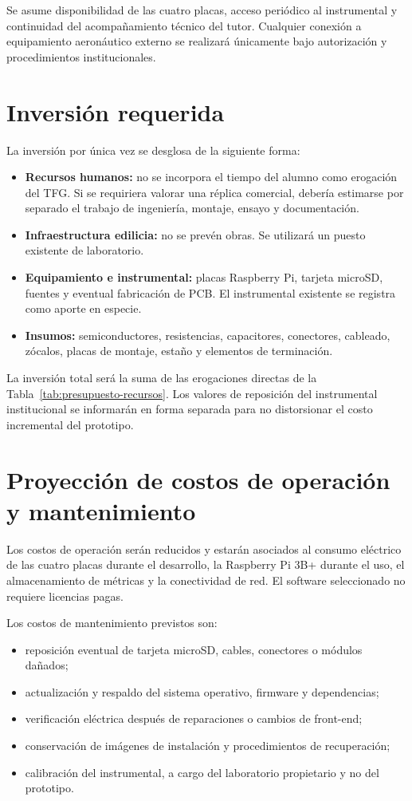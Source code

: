 \documentclass[12pt,a4paper,oneside]{article}
\begin{document}
Se asume disponibilidad de las cuatro placas, acceso periódico al instrumental y continuidad del acompañamiento técnico del tutor. Cualquier conexión a equipamiento aeronáutico externo se realizará únicamente bajo autorización y procedimientos institucionales.

\section{Inversión requerida}

La inversión por única vez se desglosa de la siguiente forma:

\begin{itemize}
  \item \textbf{Recursos humanos:} no se incorpora el tiempo del alumno como erogación del TFG. Si se requiriera valorar una réplica comercial, debería estimarse por separado el trabajo de ingeniería, montaje, ensayo y documentación.
  \item \textbf{Infraestructura edilicia:} no se prevén obras. Se utilizará un puesto existente de laboratorio.
  \item \textbf{Equipamiento e instrumental:} placas Raspberry Pi, tarjeta microSD, fuentes y eventual fabricación de PCB. El instrumental existente se registra como aporte en especie.
  \item \textbf{Insumos:} semiconductores, resistencias, capacitores, conectores, cableado, zócalos, placas de montaje, estaño y elementos de terminación.
\end{itemize}

La inversión total será la suma de las erogaciones directas de la Tabla~\ref{tab:presupuesto-recursos}. Los valores de reposición del instrumental institucional se informarán en forma separada para no distorsionar el costo incremental del prototipo.

\section{Proyección de costos de operación y mantenimiento}

Los costos de operación serán reducidos y estarán asociados al consumo eléctrico de las cuatro placas durante el desarrollo, la Raspberry Pi 3B+ durante el uso, el almacenamiento de métricas y la conectividad de red. El software seleccionado no requiere licencias pagas.

Los costos de mantenimiento previstos son:

\begin{itemize}
  \item reposición eventual de tarjeta microSD, cables, conectores o módulos dañados;
  \item actualización y respaldo del sistema operativo, firmware y dependencias;
  \item verificación eléctrica después de reparaciones o cambios de front-end;
  \item conservación de imágenes de instalación y procedimientos de recuperación;
  \item calibración del instrumental, a cargo del laboratorio propietario y no del prototipo.
\end{itemize}
\end{document}
